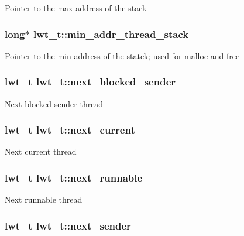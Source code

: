 Pointer to the max address of the stack \hypertarget{structlwt_a62ea9a882e0a197b9b076e1e018048d7}{
\subsubsection[{min\+\_\+addr\+\_\+thread\+\_\+stack}]{\setlength{\rightskip}{0pt plus 5cm}long$\ast$ lwt\+\_\+t\+::min\+\_\+addr\+\_\+thread\+\_\+stack}}\label{structlwt_a62ea9a882e0a197b9b076e1e018048d7}
Pointer to the min address of the statck; used for malloc and free \hypertarget{structlwt_a3998a6f0e9400a8cd5534b76a9bdb843}{
\subsubsection[{next\+\_\+blocked\+\_\+sender}]{\setlength{\rightskip}{0pt plus 5cm}lwt\+\_\+t lwt\+\_\+t\+::next\+\_\+blocked\+\_\+sender}}\label{structlwt_a3998a6f0e9400a8cd5534b76a9bdb843}
Next blocked sender thread \hypertarget{structlwt_a96a9b5218a20b704188442a3056601ae}{
\subsubsection[{next\+\_\+current}]{\setlength{\rightskip}{0pt plus 5cm}lwt\+\_\+t lwt\+\_\+t\+::next\+\_\+current}}\label{structlwt_a96a9b5218a20b704188442a3056601ae}
Next current thread \hypertarget{structlwt_a1636aae4155df6a60c90c7ab737687e4}{
\subsubsection[{next\+\_\+runnable}]{\setlength{\rightskip}{0pt plus 5cm}lwt\+\_\+t lwt\+\_\+t\+::next\+\_\+runnable}}\label{structlwt_a1636aae4155df6a60c90c7ab737687e4}
Next runnable thread \hypertarget{structlwt_a77161e9127f308ba8540546c705cc3d9}{
\subsubsection[{next\+\_\+sender}]{\setlength{\rightskip}{0pt plus 5cm}lwt\+\_\+t lwt\+\_\+t\+::next\+\_\+sender}}\label{structlwt_a77161e9127f308ba8540546c705cc3d9}
